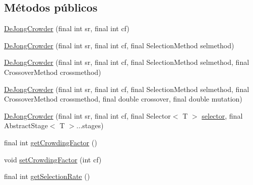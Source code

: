 \subsection*{Métodos públicos}
\begin{DoxyCompactItemize}
\item 
\hyperlink{classjenes_1_1stage_1_1operator_1_1common_1_1_de_jong_crowder_3_01_t_01extends_01_chromosome_01_4_a3a856be20539434c822eecf5fc099657}{De\-Jong\-Crowder} (final int sr, final int cf)
\item 
\hyperlink{classjenes_1_1stage_1_1operator_1_1common_1_1_de_jong_crowder_3_01_t_01extends_01_chromosome_01_4_a552f2f1d77a10c3ae9fb8c94924fb798}{De\-Jong\-Crowder} (final int sr, final int cf, final Selection\-Method selmethod)
\item 
\hyperlink{classjenes_1_1stage_1_1operator_1_1common_1_1_de_jong_crowder_3_01_t_01extends_01_chromosome_01_4_a50f143494ddff28214ac72497b0de52a}{De\-Jong\-Crowder} (final int sr, final int cf, final Selection\-Method selmethod, final Crossover\-Method crossmethod)
\item 
\hyperlink{classjenes_1_1stage_1_1operator_1_1common_1_1_de_jong_crowder_3_01_t_01extends_01_chromosome_01_4_a31f097247f16221e2074ddc05d198349}{De\-Jong\-Crowder} (final int sr, final int cf, final Selection\-Method selmethod, final Crossover\-Method crossmethod, final double crossover, final double mutation)
\item 
\hyperlink{classjenes_1_1stage_1_1operator_1_1common_1_1_de_jong_crowder_3_01_t_01extends_01_chromosome_01_4_a97d47f09a66cf05e1cfb7630410de686}{De\-Jong\-Crowder} (final int sr, final int cf, final Selector$<$ T $>$ \hyperlink{classjenes_1_1stage_1_1operator_1_1common_1_1_de_jong_crowder_3_01_t_01extends_01_chromosome_01_4_a6486b0225d345afd81b86dd04772d5ba}{selector}, final Abstract\-Stage$<$ T $>$...stages)
\item 
final int \hyperlink{classjenes_1_1stage_1_1operator_1_1common_1_1_de_jong_crowder_3_01_t_01extends_01_chromosome_01_4_af34ed99b72eedd09864a9c447179b04e}{get\-Crowding\-Factor} ()
\item 
void \hyperlink{classjenes_1_1stage_1_1operator_1_1common_1_1_de_jong_crowder_3_01_t_01extends_01_chromosome_01_4_a3420256f796449f9f486e6dc85c52f0d}{set\-Crowding\-Factor} (int cf)
\item 
final int \hyperlink{classjenes_1_1stage_1_1operator_1_1common_1_1_de_jong_crowder_3_01_t_01extends_01_chromosome_01_4_aeae8a98bdc6da2261e6071ca62c5a066}{get\-Selection\-Rate} ()
\item 

\end{DoxyCompactItemize}
